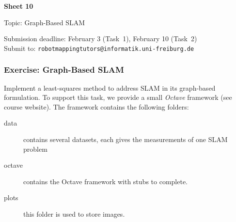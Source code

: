 \documentclass[12pt]{article}
\begin{document}


\begin{center}
{\bf \Large Sheet 10}

{\large Topic: Graph-Based SLAM}

Submission deadline: February 3 (Task~1), February 10 (Task~2)\\
Submit to: \texttt{robotmappingtutors@informatik.uni-freiburg.de}
\end{center}

\subsubsection*{Exercise: Graph-Based SLAM}

Implement a least-squares method to address SLAM in its graph-based
formulation. To support this task, we provide a small \emph{Octave} framework (see
course website).  The framework contains the following folders:

\begin{description}
\item [data]
  contains several datasets, each gives the measurements of one SLAM
  problem
\item [octave]
  contains the Octave framework with stubs to complete.
\item [plots]
  this folder is used to store images.
\end{description}
\end{document}
